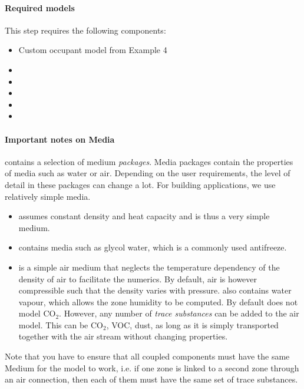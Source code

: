 \documentclass[10pt,a4paper]{article}
\begin{document}
\paragraph{Required models}
This step requires the following components:
\begin{itemize}
\item Custom occupant model from Example 4
\item {}
\item {}
\item {}
\item {}
\item {}
\end{itemize}


\paragraph{Important notes on Media}
 contains a selection of medium \textit{packages}. 
Media packages contain the properties of media such as water or air.
Depending on the user requirements, the level of detail in these packages can change a lot.
For building applications, we use relatively simple media.
\begin{itemize}
	\item {} assumes constant density and heat capacity and is thus
	a very simple medium.
	\item {} contains media such as glycol water,
	which is a commonly used antifreeze.
	\item {} is a simple air medium that 
	neglects the temperature dependency of the density of air to
	facilitate the numerics. By default, air is however compressible such that the density
	varies with pressure.
	 also contains water vapour,
	which allows the zone humidity to be computed. By default  does not model CO$_2$.
	However, any number of \textit{trace substances} can be added to the air model.
	This can be CO$_2$, VOC, dust, as long as it is simply transported together
	with the air stream without changing properties.
\end{itemize}


Note that you have to ensure that all coupled components must have the same Medium
for the model to work, i.e. if one zone is linked to a second zone through an air connection,
then each of them must have the same set of trace substances.
\end{document}
